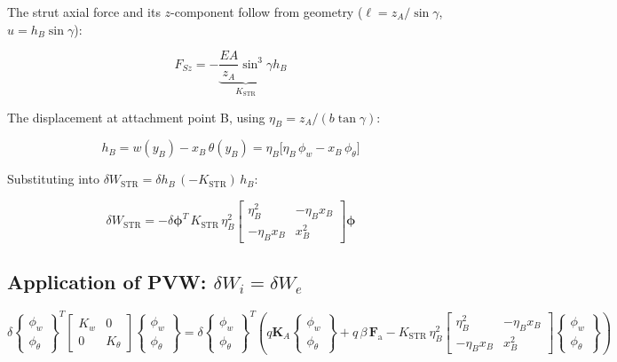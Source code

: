 The strut axial force and its $z$-component follow from geometry ($\ell = z_A/\sin\gamma$,
$u = h_B\sin\gamma$):

\begin{equation}
\boxed{F_{Sz} = -\underbrace{\frac{EA}{z_A}\sin^3\gamma}_{K_\mathrm{STR}} h_B}
\end{equation}

The displacement at attachment point B, using $\eta_B = z_A/(b\tan\gamma)$:

\[
h_B = w(y_B) - x_B\,\theta(y_B) = \eta_B\bigl[\eta_B\,\phi_w - x_B\,\phi_\theta\bigr]
\]

Substituting into $\delta W_\mathrm{STR} = \delta h_B\,(-K_\mathrm{STR})\,h_B$:

\begin{equation}
\boxed{
\delta W_\mathrm{STR} = -\delta\boldsymbol{\phi}^T\,K_\mathrm{STR}\,\eta_B^2
\begin{bmatrix} \eta_B^2 & -\eta_B x_B \\ -\eta_B x_B & x_B^2 \end{bmatrix}
\boldsymbol{\phi}
}
\end{equation}


\subsection*{Application of PVW: $\delta W_i = \delta W_e$}

\begin{equation}
\delta\begin{Bmatrix}\phi_w \\ \phi_\theta\end{Bmatrix}^T
\begin{bmatrix} K_w & 0 \\ 0 & K_\theta \end{bmatrix}
\begin{Bmatrix}\phi_w \\ \phi_\theta\end{Bmatrix}
=
\delta\begin{Bmatrix}\phi_w \\ \phi_\theta\end{Bmatrix}^T 
\left(
q\mathbf{K}_A \begin{Bmatrix}\phi_w \\ \phi_\theta\end{Bmatrix}
+ q\,\beta\,\mathbf{F}_{\mathrm{a}}
- K_{\mathrm{STR}}\,\eta_B^2\begin{bmatrix}\eta_B^2 & -\eta_B x_B \\ -\eta_B x_B & x_B^2\end{bmatrix} \begin{Bmatrix}\phi_w \\ \phi_\theta\end{Bmatrix}
\right)
\end{equation}

